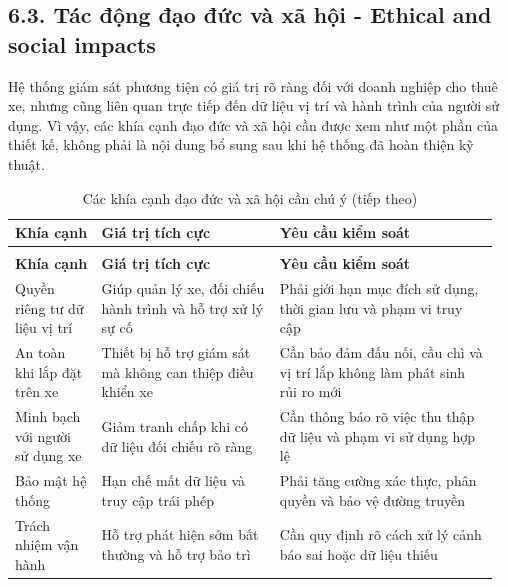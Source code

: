 \documentclass[a4paper]{extarticle}
\newcommand{\thesissettableid}[2]{%
  \renewcommand{\thetable}{#1}%
  \renewcommand{\theHtable}{#2}%
}
\begin{document}
\subsection{6.3. Tác động đạo đức và xã hội - Ethical and social impacts}\label{tuxe1c-ux111ux1ed9ng-ux111ux1ea1o-ux111ux1ee9c-vuxe0-xuxe3-hux1ed9i---ethical-and-social-impacts}

Hệ thống giám sát phương tiện có giá trị rõ ràng đối với doanh nghiệp cho thuê xe,
nhưng cũng liên quan trực tiếp đến dữ liệu vị trí và hành trình của người sử dụng.
Vì vậy, các khía cạnh đạo đức và xã hội cần được xem như một phần của thiết kế,
không phải là nội dung bổ sung sau khi hệ thống đã hoàn thiện kỹ thuật.

{\thesissettableid{6.3}{condensed-bang-6-3-cac-khia-canh-dao-duc-va-xa-hoi-can-chu-y}
\def\LTcaptype{table}
\begin{longtable}{|L{0.172\linewidth}|L{0.353\linewidth}|L{0.434\linewidth}|}
\caption{Các khía cạnh đạo đức và xã hội cần chú ý}\label{tab:condensed-bang-6-3-cac-khia-canh-dao-duc-va-xa-hoi-can-chu-y}\\
\hline
\textbf{Khía cạnh} & \textbf{Giá trị tích cực} & \textbf{Yêu cầu kiểm soát} \\
\hline
\endfirsthead
\caption[]{Các khía cạnh đạo đức và xã hội cần chú ý (tiếp theo)}\\
\hline
\textbf{Khía cạnh} & \textbf{Giá trị tích cực} & \textbf{Yêu cầu kiểm soát} \\
\hline
\endhead
\endfoot
\endlastfoot
Quyền riêng tư dữ liệu vị trí & Giúp quản lý xe, đối chiếu hành trình và hỗ trợ xử lý sự cố & Phải giới hạn mục đích sử dụng, thời gian lưu và phạm vi truy cập \\\hline
An toàn khi lắp đặt trên xe & Thiết bị hỗ trợ giám sát mà không can thiệp điều khiển xe & Cần bảo đảm đấu nối, cầu chì và vị trí lắp không làm phát sinh rủi ro mới \\\hline
Minh bạch với người sử dụng xe & Giảm tranh chấp khi có dữ liệu đối chiếu rõ ràng & Cần thông báo rõ việc thu thập dữ liệu và phạm vi sử dụng hợp lệ \\\hline
Bảo mật hệ thống & Hạn chế mất dữ liệu và truy cập trái phép & Phải tăng cường xác thực, phân quyền và bảo vệ đường truyền \\\hline
Trách nhiệm vận hành & Hỗ trợ phát hiện sớm bất thường và hỗ trợ bảo trì & Cần quy định rõ cách xử lý cảnh báo sai hoặc dữ liệu thiếu \\\hline
\end{longtable}
}
\end{document}
